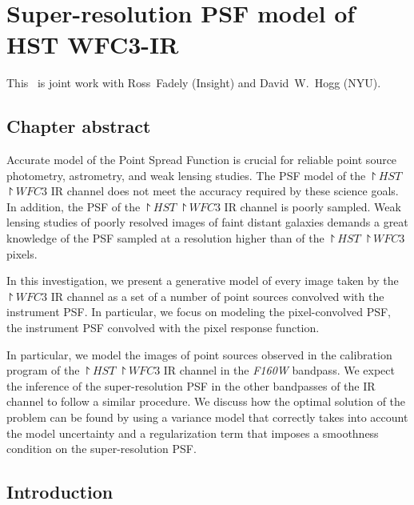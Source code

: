 \newcommand{\todo}[1]{{\em \textcolor{red}{ #1}}}
\newcommand{\beq}{\begin{equation}}
\newcommand{\eeq}{\end{equation}}
\newcommand{\lang}{\langle}
\newcommand{\ra}{\rangle}
\newcommand{\vep}{\bm{\epsilon}}
\newcommand{\ep}{\epsilon}
\newcommand{\pars}{\vec{\theta}}
\newcommand{\dev}{\mathrm{d}}
\newcommand{\mstar}{h^{-1}M_\odot}
\newcommand{\hst}{\project{HST}}
\newcommand{\wfc}{\project{WFC3}}

\chapter{Super-resolution PSF model of HST WFC3-IR}

This \paper\ is joint work with Ross~Fadely (Insight) and David~W.~Hogg (NYU). 

\section{Chapter abstract}

Accurate model of the Point Spread Function is crucial for reliable point source photometry, astrometry, and weak lensing studies.
The PSF model of the $\hst$ $\wfc$ IR channel does not meet the accuracy required by these science goals. 
In addition, the PSF of the $\hst$ $\wfc$ IR 
channel is poorly sampled. Weak lensing studies of poorly resolved images of faint distant galaxies demands 
a great knowledge of the PSF sampled at a resolution higher than of the $\hst$ $\wfc$ pixels.

In this investigation, we present a generative model of every image taken by the $\wfc$ IR channel as a set of a number of point sources convolved
with the instrument PSF. In particular, we focus on modeling the pixel-convolved PSF, the instrument PSF convolved with the pixel response function. 

In particular, we model the images of point sources observed in the calibration program of the $\hst$ $\wfc$ IR channel in the \emph{F160W} bandpass. 
We expect the inference of the super-resolution PSF in the other bandpasses of the IR channel to follow a similar procedure. 
We discuss how the optimal solution of the problem can be found by using a variance model that correctly takes into account the model 
uncertainty and a regularization term that imposes a smoothness condition on the super-resolution PSF. 

\section{Introduction}

